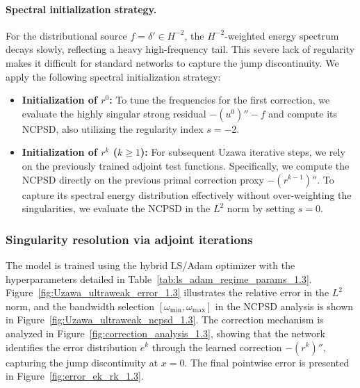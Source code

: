 \documentclass{article}
\theoremstyle{definition}
\begin{document}
\paragraph{Spectral initialization strategy.}
For the distributional source $f = \delta' \in H^{-2}$, the $H^{-2}$-weighted energy spectrum decays slowly, reflecting a heavy high-frequency tail. This severe lack of regularity makes it difficult for standard networks to capture the jump discontinuity. We apply the following spectral initialization strategy:
\begin{itemize}
    \item \textbf{Initialization of $r^0$:} To tune the frequencies for the first correction, we evaluate the highly singular strong residual $-(u^0)'' - f$ and compute its NCPSD, also utilizing the regularity index $s = -2$.
    \item \textbf{Initialization of $r^k$ ($k \ge 1$):} For subsequent Uzawa iterative steps, we rely on the previously trained adjoint test functions. Specifically, we compute the NCPSD directly on the previous primal correction proxy $-(r^{k-1})''$. To capture its spectral energy distribution effectively without over-weighting the singularities, we evaluate the NCPSD in the $L^2$ norm by setting $s = 0$.
\end{itemize}

\subsubsection{Singularity resolution via adjoint iterations}
The model is trained using the hybrid LS/Adam optimizer with the hyperparameters detailed in Table~\ref{tab:ls_adam_regime_params_1.3}. Figure~\ref{fig:Uzawa_ultraweak_error_1.3} illustrates the relative error in the $L^2$ norm, and the bandwidth selection $[\omega_{\min},\omega_{\max}]$ in the NCPSD analysis is shown in Figure~\ref{fig:Uzawa_ultraweak_ncpsd_1.3}. The correction mechanism is analyzed in Figure~\ref{fig:correction_analysis_1.3}, showing that the network identifies the error distribution $e^k$ through the learned correction $-(r^k)''$, capturing the jump discontinuity at $x=0$. The final pointwise error is presented in Figure~\ref{fig:error_ek_rk_1.3}.
\end{document}
